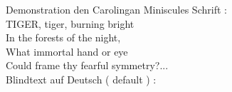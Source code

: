 \documentclass{minimal}
\begin{document}
\cminfamily 
Demonstration den  Carolingan Miniscules Schrift :  \\
TIGER, tiger, burning bright \\	 
In the forests of the night, \\	 
What immortal hand or eye \\	 
Could frame thy fearful symmetry?...\\

Blindtext auf Deutsch ( default  ) :  \\ 
\blindtext 
\end{document}
